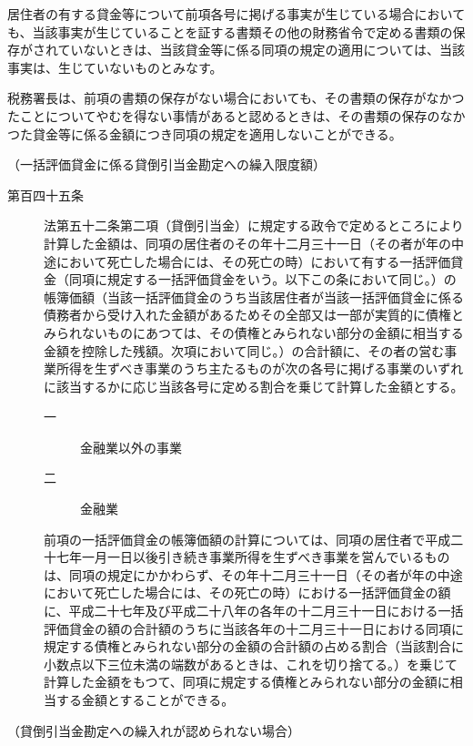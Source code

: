 \documentclass[twocolumn,a4j,10pt]{ltjtarticle}
\begin{document}
\begin{description}
\begin{description}
\end{description}
\item[\rensuji{2}]居住者の有する貸金等について前項各号に掲げる事実が生じている場合においても、当該事実が生じていることを証する書類その他の財務省令で定める書類の保存がされていないときは、当該貸金等に係る同項の規定の適用については、当該事実は、生じていないものとみなす。
\item[\rensuji{3}]税務署長は、前項の書類の保存がない場合においても、その書類の保存がなかつたことについてやむを得ない事情があると認めるときは、その書類の保存のなかつた貸金等に係る金額につき同項の規定を適用しないことができる。
\end{description}
\noindent\hspace{10pt}（一括評価貸金に係る貸倒引当金勘定への繰入限度額）
\begin{description}
\item[第百四十五条]法第五十二条第二項（貸倒引当金）に規定する政令で定めるところにより計算した金額は、同項の居住者のその年十二月三十一日（その者が年の中途において死亡した場合には、その死亡の時）において有する一括評価貸金（同項に規定する一括評価貸金をいう。以下この条において同じ。）の帳簿価額（当該一括評価貸金のうち当該居住者が当該一括評価貸金に係る債務者から受け入れた金額があるためその全部又は一部が実質的に債権とみられないものにあつては、その債権とみられない部分の金額に相当する金額を控除した残額。次項において同じ。）の合計額に、その者の営む事業所得を生ずべき事業のうち主たるものが次の各号に掲げる事業のいずれに該当するかに応じ当該各号に定める割合を乗じて計算した金額とする。
\begin{description}
\item[一]金融業以外の事業
\item[二]金融業
\end{description}
\item[]前項の一括評価貸金の帳簿価額の計算については、同項の居住者で平成二十七年一月一日以後引き続き事業所得を生ずべき事業を営んでいるものは、同項の規定にかかわらず、その年十二月三十一日（その者が年の中途において死亡した場合には、その死亡の時）における一括評価貸金の額に、平成二十七年及び平成二十八年の各年の十二月三十一日における一括評価貸金の額の合計額のうちに当該各年の十二月三十一日における同項に規定する債権とみられない部分の金額の合計額の占める割合（当該割合に小数点以下三位未満の端数があるときは、これを切り捨てる。）を乗じて計算した金額をもつて、同項に規定する債権とみられない部分の金額に相当する金額とすることができる。
\end{description}
\noindent\hspace{10pt}（貸倒引当金勘定への繰入れが認められない場合）
\end{document}
